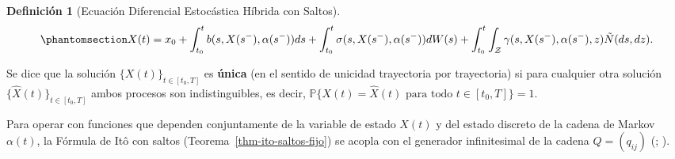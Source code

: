 \documentclass[
  spanish,
  letterpaper,
  DIV=11,
  numbers=noendperiod]{scrreprt}
\theoremstyle{plain}
\theoremstyle{plain}
\theoremstyle{plain}
\theoremstyle{definition}
\newtheorem{definition}{Definición}[chapter]
\theoremstyle{remark}
\begin{document}
\begin{definition}[Ecuación Diferencial Estocástica Híbrida con
Saltos]
\begin{equation}\phantomsection\label{eq-ede-hibrida-int}{
X(t) = x_0 + \int_{t_0}^t b(s, X(s^-), \alpha(s^-)) ds + \int_{t_0}^t \sigma(s, X(s^-), \alpha(s^-)) dW(s) + \int_{t_0}^t \int_{\mathcal{Z}} \gamma(s, X(s^-), \alpha(s^-), z) \tilde{N}(ds, dz).
}\end{equation}

Se dice que la solución \(\{X(t)\}_{t \in [t_0, T]}\) es \textbf{única}
(en el sentido de unicidad trayectoria por trayectoria) si para
cualquier otra solución \(\{\widehat{X}(t)\}_{t \in [t_0, T]}\) ambos
procesos son indistinguibles, es decir,
\(\mathbb{P}\{X(t) = \widehat{X}(t) \text{ para todo } t \in [t_0, T]\} = 1\).

\end{definition}

Para operar con funciones que dependen conjuntamente de la variable de
estado \(X(t)\) y del estado discreto de la cadena de Markov
\(\alpha(t)\), la Fórmula de Itô con saltos
(Teorema~\ref{thm-ito-saltos-fijo}) se acopla con el generador
infinitesimal de la cadena \(Q = (q_{ij})\)
(;
).
\end{document}
